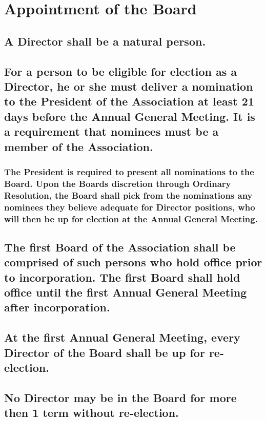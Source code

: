 \documentclass{article}
\newenvironment{subs}
  {\adjustwidth{2em}{0pt}}
  {\endadjustwidth}
\begin{document}
\section{Appointment of the Board}
\begin{subs}
\subsection{A Director shall be a natural person.}
\subsection{For a person to be eligible for election as a Director, he or she must deliver a nomination to the President of the Association at least 21 days before the Annual General Meeting. It is a requirement that nominees must be a member of the Association.}
\begin{subs}
\subsubsection{The President is required to present all nominations to the Board. Upon the Boards discretion through Ordinary Resolution, the Board shall pick from the nominations any nominees they believe adequate for Director positions, who will then be up for election at the Annual General Meeting.}
\end{subs}
\subsection{The first Board of the Association shall be comprised of such persons who hold office prior to incorporation. The first Board shall hold office until the first Annual General Meeting after incorporation.}
\newpage

\subsection{At the first Annual General Meeting, every Director of the Board shall be up for re-election.}
\subsection{No Director may be in the Board for more then 1 term without re-election.}
\end{subs}
\end{document}

